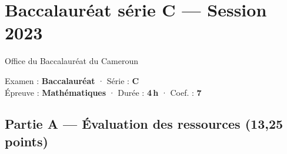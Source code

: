 \section{Baccalauréat série C — Session 2023}
\noindent\begin{minipage}{0.5\linewidth}\footnotesize Office du Baccalauréat du Cameroun\end{minipage}%
\hfill\begin{minipage}{0.45\linewidth}\footnotesize\raggedleft Examen : \textbf{Baccalauréat} · Série : \textbf{C}\\
Épreuve : \textbf{Mathématiques} · Durée : \textbf{4\,h} · Coef. : \textbf{7}\end{minipage}
\par\smallskip{\color{onbo}\rule{\linewidth}{1pt}}

\subsection*{Partie A — Évaluation des ressources \hfill (13,25 points)}

